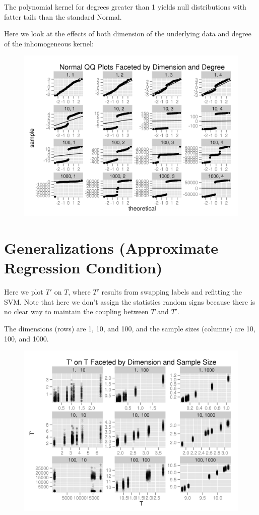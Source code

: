 The polynomial kernel for degrees greater than 1 yields null
distributions with fatter tails than the standard Normal.
\clearpage

Here we look at the effects of both dimension of the underlying data
and degree of the inhomogeneous kernel:
\begin{figure}[!ht]
  \centering
  \includegraphics{./simulations/ARC/multivar_poly_ker_qq.png}
\end{figure}
\clearpage

\section{Generalizations (Approximate Regression Condition)}
Here we plot $T'$ on $T$, where $T'$ results from swapping labels and
refitting the SVM.  Note that here we don't assign the statistics
random signs because there is no clear way to maintain the coupling
between $T$ and $T'$.

The dimensions (rows) are 1, 10, and 100, and the sample sizes
(columns) are 10, 100, and 1000.
\begin{figure}[!ht]
  \centering
  \includegraphics{./simulations/ARC/multivar_ARC.png}
\end{figure}

